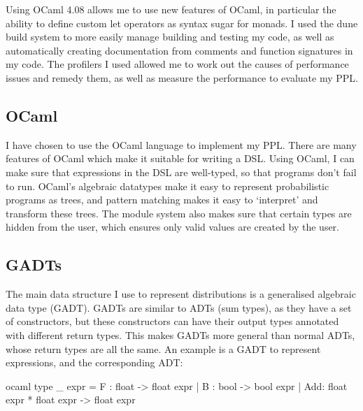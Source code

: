 Using OCaml 4.08 allows me to use new features of OCaml, in particular the ability to define custom let operators as syntax sugar for monads. I used the dune build system to more easily manage building and testing my code, as well as automatically creating documentation from comments and function signatures in my code. The profilers I used allowed me to work out the causes of performance issues and remedy them, as well as measure the performance to evaluate my PPL.

\subsection{OCaml}
I have chosen to use the OCaml language to implement my PPL. There are many features of OCaml which make it suitable for writing a DSL. Using OCaml, I can make sure that expressions in the DSL are well-typed, so that programs don't fail to run. OCaml's algebraic datatypes make it easy to represent probabilistic programs as trees, and pattern matching makes it easy to `interpret' and transform these trees. The module system also makes sure that certain types are hidden from the user, which ensures only valid values are created by the user.

\subsection{GADTs}
The main data structure I use to represent distributions is a generalised algebraic data type (GADT). GADTs are similar to ADTs (sum types), as they have a set of constructors, but these constructors can have their output types annotated with different return types. This makes GADTs more general than normal ADTs, whose return types are all the same. An example is a GADT to represent expressions, and the corresponding ADT:

\begin{listing}
\centering
\begin{cminted}{ocaml}
type _ expr = 
    F : float -> float expr
  | B : bool -> bool expr
  | Add: float expr * float expr -> float expr
\end{cminted}
\end{listing}

